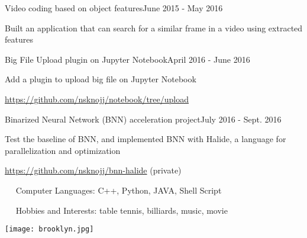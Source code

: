 \documentclass{joel_cv}
\begin{document}
\begin{sectionContentSimple}{Video coding based on object features}{June 2015 - May 2016}
\item Built an application that can search for a similar frame in a video using extracted features
\end{sectionContentSimple}

\begin{sectionContentSimple}{Big File Upload plugin on Jupyter Notebook}{April 2016 - June 2016}
\item Add a plugin to upload big file on Jupyter Notebook
\item \url{https://github.com/nsknojj/notebook/tree/upload}
\end{sectionContentSimple}

\begin{sectionContentSimple}{Binarized Neural Network (BNN) acceleration project}{July 2016 - Sept. 2016}
\item Test the baseline of BNN, and implemented BNN with Halide, a language for parallelization and optimization
\item \url{https://github.com/nsknojj/bnn-halide} (private)
\end{sectionContentSimple}


%
%

\begin{description}{}
	\item{\ \ } Computer Languages: C++, Python, JAVA, Shell Script
	\item{\ \ } Hobbies and Interests: table tennis, billiards, music, movie
\end{description}

%
%




\centering \texttt{[image: brooklyn.jpg]}
\end{document}
